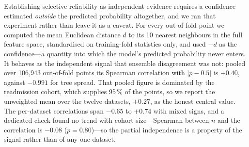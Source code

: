 \documentclass[fleqn,10pt]{wlscirep}
\newcommand{\result}[1]{#1}
\begin{document}
Establishing selective reliability as independent evidence requires a confidence estimated
\emph{outside} the predicted probability altogether, and we ran that experiment rather than leave it
as a caveat. For every out-of-fold point we computed the mean Euclidean distance $d$ to its
\result{10} nearest neighbours in the full feature space, standardised on training-fold statistics
only, and used $-d$ as the confidence---a quantity into which the model's predicted probability never
enters. It behaves as the independent signal that ensemble disagreement was not: pooled over
\result{106{,}943} out-of-fold points its Spearman correlation with $|p-0.5|$ is \result{$+0.40$},
against \result{$-0.991$} for tree spread. That pooled figure is dominated by the readmission cohort,
which supplies \result{95\,\%} of the points, so we report the unweighted mean over the twelve
datasets, \result{$+0.27$}, as the honest central value. The per-dataset correlations span
\result{$-0.65$} to \result{$+0.74$} with mixed signs, and a dedicated check found no trend with
cohort size---Spearman between $n$ and the correlation is \result{$-0.08$}
($p=\result{0.80}$)---so the partial independence is a property of the signal rather than of any one
dataset.
\end{document}
